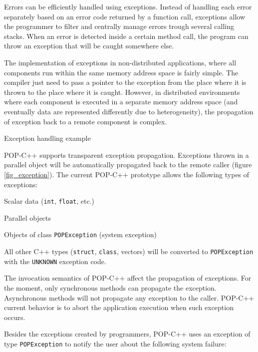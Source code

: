 Errors can be efficiently handled using exceptions. Instead of handling
each error separately based on an error code returned by a function
call, exceptions allow the programmer to filter and centrally manage
errors trough several calling stacks. When an error is detected inside a
certain method call, the program can throw an exception that will be
caught somewhere else.

The implementation of exceptions in non-distributed applications, where
all components run within the same memory address space is fairly
simple. The compiler just need to pass a pointer to the exception from
the place where it is thrown to the place where it is caught. However,
in distributed environments where each component is executed in a
separate memory address space (and eventually data are represented
differently due to heterogeneity), the propagation of exception back to
a remote component is complex.

{Exception handling example}



POP-C++ supports transparent exception propagation. Exceptions thrown in
a parallel object will be automatically propagated back to the remote
caller (figure \ref{fig_exception}). The current POP-C++ prototype allows
the following types of exceptions:

\begin{petitem}

\item Scalar data (\texttt{int}, \texttt{float}, etc.)

\item Parallel objects

\item Objects of class \texttt{POPException} (system exception)

\end{petitem}

All other C++ types (\texttt{struct}, \texttt{class}, vectors) will be
converted to \texttt{POPException} with the \texttt{UNKNOWN}
exception code.

The invocation semantics of POP-C++ affect the propagation of
exceptions. For the moment, only synchronous methods can propagate the
exception. Asynchronous methods will not propagate any exception to the
caller. POP-C++ current behavior is to abort the application execution
when such exception occurs.

Besides the exceptions created by programmers, POP-C++ uses an
exception of type \texttt{POPException} to notify the user about
the following system failure:

